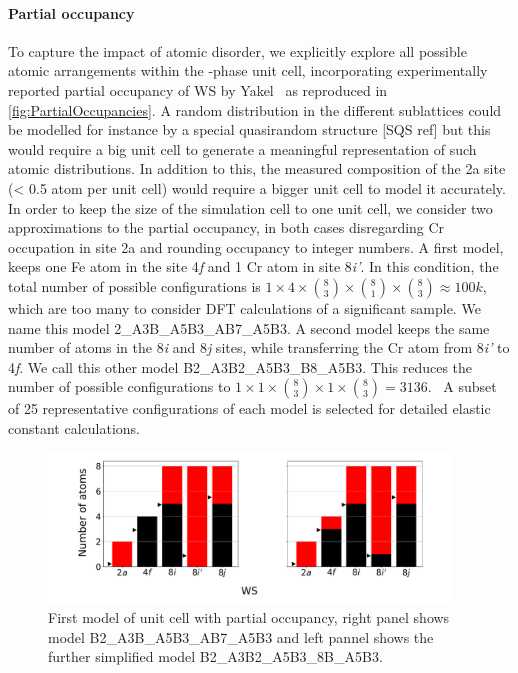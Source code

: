 \documentclass[superscriptaddress, 12pt]{revtex4-2}%
\begin{document}
\paragraph{Partial occupancy} To capture the impact of atomic disorder, we explicitly explore all possible atomic arrangements within the \textsigma-phase unit cell, incorporating experimentally reported partial occupancy of WS by Yakel~\cite{yakel_atom_1983} as reproduced in \autoref{fig:PartialOccupancies}.  
A random distribution in the different sublattices could be modelled for instance by a special quasirandom structure [SQS ref] but  this would require a big unit cell to generate a meaningful representation of such atomic distributions. 
In addition to this, the measured composition of the 2a site (< 0.5 atom per unit cell) would require a bigger unit cell to model it accurately.
In order to keep the size of the simulation cell to one unit cell, we consider two approximations to the partial occupancy, in both cases disregarding Cr occupation in site 2a and rounding occupancy to integer numbers.  
A first model, keeps one Fe atom in the site 4\textit{f} and 1 Cr atom in site 8\textit{i'}.  
In this condition, the total number of possible configurations is $ 1 \times 4 \times \binom{8}{3}\times \binom{8}{1} \times \binom {8}{3} \approx 100k $, which are too many to consider DFT calculations of a significant sample. 
We name this model 2\_A3B\_A5B3\_AB7\_A5B3.  
A second model keeps the same number of atoms in the 8\textit{i} and 8\textit{j} sites, while transferring the Cr atom from 8\textit{i'} to 4\textit{f}.  
We call this other model B2\_A3B2\_A5B3\_B8\_A5B3. 
This reduces the number of possible configurations to $1 \times 1 \times \binom{8}{3}\times 1\times\binom {8}{3} = 3136$.~
A subset of 25 representative configurations of each model is selected for detailed elastic constant calculations.

\begin{figure}
  
\includegraphics[height=4cm]{Figure_both_distributions.pdf}
  \caption{\protect\label{fig:PartialOccupancies}
    First model of unit cell with partial occupancy, right panel shows model B2\_A3B\_A5B3\_AB7\_A5B3 and left pannel 
    shows the further simplified model B2\_A3B2\_A5B3\_8B\_A5B3.
  }
\end{figure}
\end{document}
